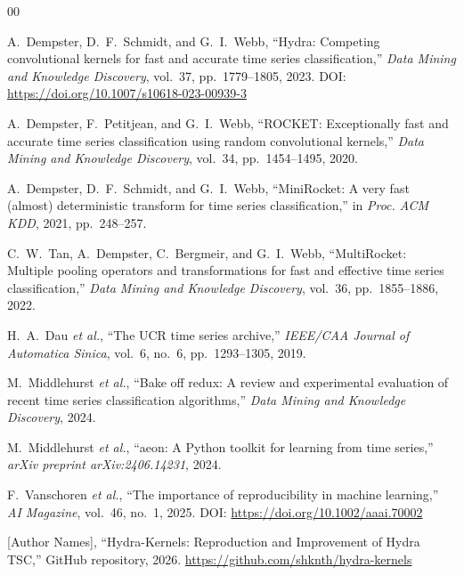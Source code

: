 \documentclass[conference]{IEEEtran}
\begin{document}
\begin{thebibliography}{00}

A.~Dempster, D.~F.~Schmidt, and G.~I.~Webb,
``Hydra: Competing convolutional kernels for fast and accurate time series
classification,''
\textit{Data Mining and Knowledge Discovery}, vol.~37, pp.~1779--1805, 2023.
DOI: \url{https://doi.org/10.1007/s10618-023-00939-3}

A.~Dempster, F.~Petitjean, and G.~I.~Webb,
``ROCKET: Exceptionally fast and accurate time series classification using
random convolutional kernels,''
\textit{Data Mining and Knowledge Discovery}, vol.~34, pp.~1454--1495, 2020.

A.~Dempster, D.~F.~Schmidt, and G.~I.~Webb,
``MiniRocket: A very fast (almost) deterministic transform for time series
classification,''
in \textit{Proc. ACM KDD}, 2021, pp.~248--257.

C.~W.~Tan, A.~Dempster, C.~Bergmeir, and G.~I.~Webb,
``MultiRocket: Multiple pooling operators and transformations for fast and
effective time series classification,''
\textit{Data Mining and Knowledge Discovery}, vol.~36, pp.~1855--1886, 2022.

H.~A.~Dau \textit{et al.},
``The UCR time series archive,''
\textit{IEEE/CAA Journal of Automatica Sinica}, vol.~6, no.~6,
pp.~1293--1305, 2019.

M.~Middlehurst \textit{et al.},
``Bake off redux: A review and experimental evaluation of recent time series
classification algorithms,''
\textit{Data Mining and Knowledge Discovery}, 2024.

M.~Middlehurst \textit{et al.},
``aeon: A Python toolkit for learning from time series,''
\textit{arXiv preprint arXiv:2406.14231}, 2024.

F.~Vanschoren \textit{et al.},
``The importance of reproducibility in machine learning,''
\textit{AI Magazine}, vol.~46, no.~1, 2025.
DOI: \url{https://doi.org/10.1002/aaai.70002}

[Author Names],
``Hydra-Kernels: Reproduction and Improvement of Hydra TSC,''
GitHub repository, 2026.
\url{https://github.com/shknth/hydra-kernels}

\end{thebibliography}
\end{document}
